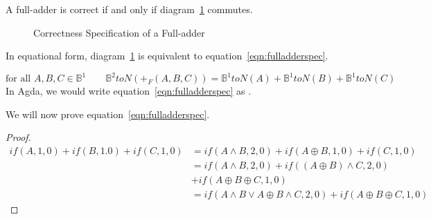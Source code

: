 \documentclass[14pt]{extarticle}  %
\begin{document}
A full-adder is correct if and only if diagram~\ref{fig:fulladder} commutes.
\begin{figure}[h]
\centering
\caption{Correctness Specification of a Full-adder}
\label{fig:fulladder}
\end{figure}
In equational form, diagram~\ref{fig:fulladder} is equivalent to equation~\ref{eqn:fulladderspec}.

\begin{equation}\label{eqn:fulladderspec}
  \text{for all }A,B, C \in \mathbb{B}^{1} \qquad \mathbb{B}^{2}toN(+_{F}(A,B,C)) = \mathbb{B}^{1}toN(A) + \mathbb{B}^{1}toN(B)+\mathbb{B}^{1}toN(C)
\end{equation}
 In Agda, we would write equation~\ref{eqn:fulladderspec} as .

We will now prove equation~\ref{eqn:fulladderspec}.

\begin{proof}
  \begin{align*}
    if(A,1,0) + if(B,1.0) + if(C,1,0)
    &= if(A \land B , 2, 0) + if(A \oplus B, 1, 0) + if(C, 1, 0) \\
    &= if(A \land B , 2, 0) + if( (A \oplus B) \land C, 2, 0)\\ &+ if(A \oplus B \oplus C, 1, 0) \\
    &= if( A \land B \lor A \oplus B \land C , 2 , 0 ) + if(A \oplus B \oplus C , 1, 0)
    \end{align*}
\end{proof}
\end{document}
